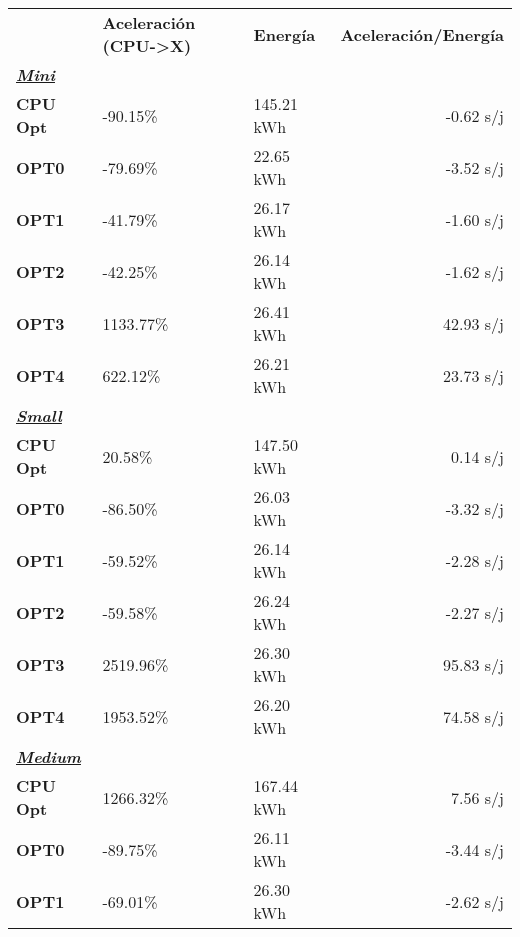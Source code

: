 \begin{table}[H]
    \centering
    \begin{tabular}{lllr}
    \rowcolor[HTML]{DAE8FC} \ & \textbf{Aceleración (CPU->X)} & \textbf{	Energía} & \textbf{	Aceleración/Energía} \\
    \cellcolor[HTML]{DAE8FC} \textbf{\textbf{{\emph{{\underline{{Mini}}}}}}} & &	&	 \\
    \rowcolor[HTML]{EFEFEF} \cellcolor[HTML]{DAE8FC} \textbf{CPU Opt} &-90.15\%  &	145.21 kWh  &	-0.62 s/j \\
    \cellcolor[HTML]{DAE8FC} \textbf{OPT0} & -79.69\%  &	22.65 kWh  &	-3.52 s/j \\
    \rowcolor[HTML]{EFEFEF} \cellcolor[HTML]{DAE8FC} \textbf{OPT1} &-41.79\%  &	26.17 kWh  &	-1.60 s/j \\
    \cellcolor[HTML]{DAE8FC} \textbf{OPT2} & -42.25\%  &	26.14 kWh  &	-1.62 s/j \\
    \rowcolor[HTML]{EFEFEF} \cellcolor[HTML]{DAE8FC} \textbf{OPT3} &1133.77\%  &	26.41 kWh  &	42.93 s/j \\
    \cellcolor[HTML]{DAE8FC} \textbf{OPT4} & 622.12\%  &	26.21 kWh  &	23.73 s/j \\
    \rowcolor[HTML]{EFEFEF} \cellcolor[HTML]{DAE8FC} \textbf{\textbf{{\emph{{\underline{{Small}}}}}}} &&	&	 \\
    \cellcolor[HTML]{DAE8FC} \textbf{CPU Opt} & 20.58\%  &	147.50 kWh  &	0.14 s/j \\
    \rowcolor[HTML]{EFEFEF} \cellcolor[HTML]{DAE8FC} \textbf{OPT0} &-86.50\%  &	26.03 kWh  &	-3.32 s/j \\
    \cellcolor[HTML]{DAE8FC} \textbf{OPT1} & -59.52\%  &	26.14 kWh  &	-2.28 s/j \\
    \rowcolor[HTML]{EFEFEF} \cellcolor[HTML]{DAE8FC} \textbf{OPT2} &-59.58\%  &	26.24 kWh  &	-2.27 s/j \\
    \cellcolor[HTML]{DAE8FC} \textbf{OPT3} & 2519.96\%  &	26.30 kWh  &	95.83 s/j \\
    \rowcolor[HTML]{EFEFEF} \cellcolor[HTML]{DAE8FC} \textbf{OPT4} &1953.52\%  &	26.20 kWh  &	74.58 s/j \\
    \cellcolor[HTML]{DAE8FC} \textbf{\textbf{{\emph{{\underline{{Medium}}}}}}} & &	&	 \\
    \rowcolor[HTML]{EFEFEF} \cellcolor[HTML]{DAE8FC} \textbf{CPU Opt} &1266.32\%  &	167.44 kWh  &	7.56 s/j \\
    \cellcolor[HTML]{DAE8FC} \textbf{OPT0} & -89.75\%  &	26.11 kWh  &	-3.44 s/j \\
    \rowcolor[HTML]{EFEFEF} \cellcolor[HTML]{DAE8FC} \textbf{OPT1} &-69.01\%  &	26.30 kWh  &	-2.62 s/j \\

\end{tabular}
\end{table}
